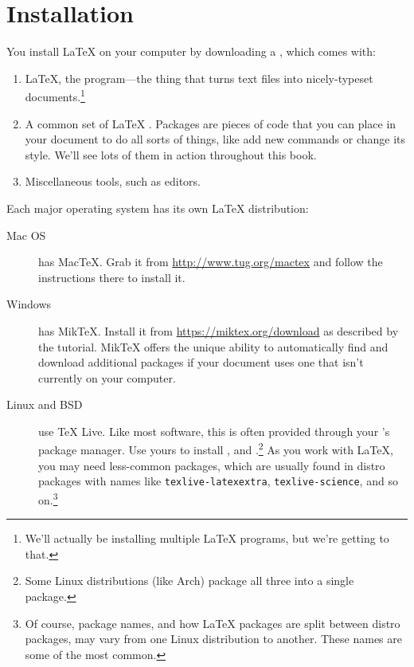 \chapter{Installation}
\label{installation}

You install \LaTeX{} on your computer by downloading a ,
which comes with:
\begin{enumerate}
\item \LaTeX, the program---the thing that turns text files into nicely-typeset
    documents.\footnote{We'll actually be installing multiple \LaTeX{} programs,
    but we're getting to that.}
\item A common set of \LaTeX{} .
    Packages are pieces of code that you can place in your document to
    do all sorts of things, like add new commands or change its style.
    We'll see lots of them in action throughout this book.
\item Miscellaneous tools, such as editors.
\end{enumerate}
Each major operating system has its own \LaTeX{} distribution:
\begin{description}
\item[Mac OS] has Mac\TeX. Grab it from \url{http://www.tug.org/mactex}
    and follow the instructions there to install it.

\item[Windows] has Mik\TeX.
    Install it from \url{https://miktex.org/download}
    as described by the tutorial.
    Mik\TeX{} offers the unique ability to automatically find and download
    additional packages if your document uses one that isn't currently
    on your computer.

\item[Linux and BSD] use \TeX{} Live.
    Like most software, this is often provided through your
    's package manager.
    Use yours to install ,
     and .\punckern\footnote{%
    Some Linux distributions (like Arch) package all three into a
    single  package.}
    As you work with \LaTeX, you may need less-common packages,
    which are usually found in distro packages with names like
    \texttt{texlive-latexextra}, \texttt{texlive-science},
    and so on.\punckern\footnote{Of
    course, package names, and how \LaTeX{} packages are split between
    distro packages, may vary from one Linux distribution to another.
    These names are some of the most common.}
\end{description}

